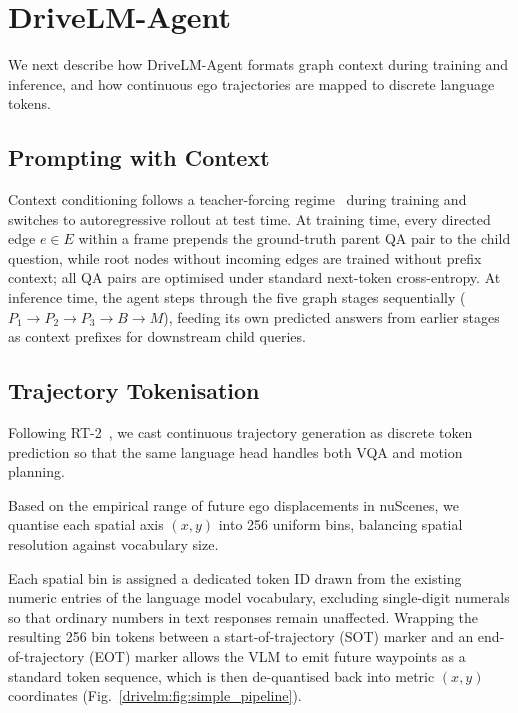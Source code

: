 \section{DriveLM-Agent}\label{drivelm:app:agent}

We next describe how DriveLM-Agent formats graph context during training and inference, and how continuous ego trajectories are mapped to discrete language tokens.

\subsection{Prompting with Context}\label{drivelm:app:agent_context}

Context conditioning follows a teacher-forcing regime~\cite{lamb2016professor,toomarian1992learning} during training and switches to autoregressive rollout at test time. At training time, every directed edge $e\in E$ within a frame prepends the ground-truth parent QA pair to the child question, while root nodes without incoming edges are trained without prefix context; all QA pairs are optimised under standard next-token cross-entropy. At inference time, the agent steps through the five graph stages sequentially ($P_1 \rightarrow P_2 \rightarrow P_3 \rightarrow B \rightarrow M$), feeding its own predicted answers from earlier stages as context prefixes for downstream child queries.

\subsection{Trajectory Tokenisation}\label{drivelm:app:agent_tokenisation}

Following RT-2~\cite{zitkovich2023rt2}, we cast continuous trajectory generation as discrete token prediction so that the same language head handles both VQA and motion planning.

Based on the empirical range of future ego displacements in nuScenes, we quantise each spatial axis $(x,y)$ into 256 uniform bins, balancing spatial resolution against vocabulary size.

Each spatial bin is assigned a dedicated token ID drawn from the existing numeric entries of the language model vocabulary, excluding single-digit numerals so that ordinary numbers in text responses remain unaffected. Wrapping the resulting 256 bin tokens between a start-of-trajectory (SOT) marker and an end-of-trajectory (EOT) marker allows the VLM to emit future waypoints as a standard token sequence, which is then de-quantised back into metric $(x,y)$ coordinates (Fig.~\ref{drivelm:fig:simple_pipeline}).


